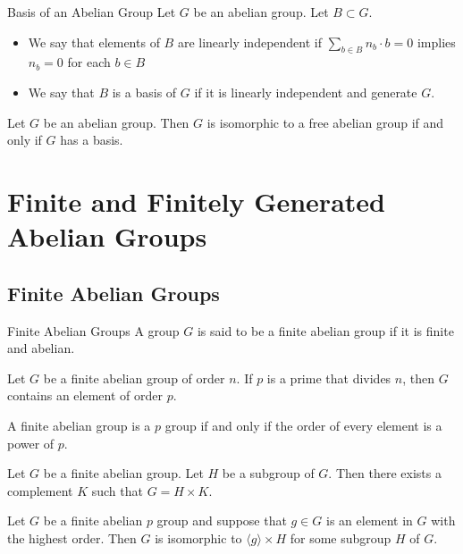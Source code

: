 \documentclass[a4paper]{article}
\begin{document}
\begin{defn}{Basis of an Abelian Group}{} Let $G$ be an abelian group. Let $B\subset G$. 
\begin{itemize}
\item We say that elements of $B$ are linearly independent if $\sum_{b\in B}n_b\cdot b=0$ implies $n_b=0$ for each $b\in B$
\item We say that $B$ is a basis of $G$ if it is linearly independent and generate $G$. 
\end{itemize}
\end{defn}

\begin{prp}{}{} Let $G$ be an abelian group. Then $G$ is isomorphic to a free abelian group if and only if $G$ has a basis. 
\end{prp}

\pagebreak
\section{Finite and Finitely Generated Abelian Groups}
\subsection{Finite Abelian Groups}
\begin{defn}{Finite Abelian Groups}{} A group $G$ is said to be a finite abelian group if it is finite and abelian. 
\end{defn}

\begin{lmm}{}{} Let $G$ be a finite abelian group of order $n$. If $p$ is a prime that divides $n$, then $G$ contains an element of order $p$. 
\end{lmm}

\begin{lmm}{}{} A finite abelian group is a $p$ group if and only if the order of every element is a power of $p$. 
\end{lmm}

\begin{lmm}{}{} Let $G$ be a finite abelian group. Let $H$ be a subgroup of $G$. Then there exists a complement $K$ such that $G=H\times K$. 
\end{lmm}

\begin{lmm}{}{} Let $G$ be a finite abelian $p$ group and suppose that $g\in G$ is an element in $G$ with the highest order. Then $G$ is isomorphic to $\langle g\rangle\times H$ for some subgroup $H$ of $G$. 
\end{lmm}
\end{document}
